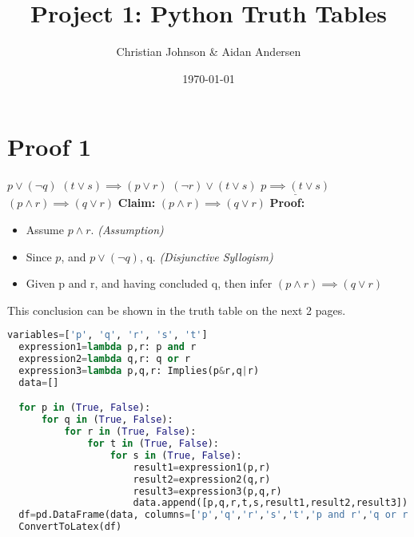 \documentclass[11pt]{article}
\author{Christian Johnson \& Aidan Andersen}
\date{\today}
\title{Project 1: Python Truth Tables}
\begin{document}
\maketitle
\newpage
\section*{Proof 1}
\label{sec:org636193d}
$p\lor(\lnot q)$\newline
$(t\lor s)\implies(p\lor r)$\newline
$(\lnot r)\lor(t\lor s)$\newline
$\underline{p\implies(t\lor s)}$\newline
$(p\land r)\implies(q\lor r)$\newline\newline
\textbf{Claim:} $(p \land r) \implies (q\lor r)$\newline
\newline
\textbf{Proof:}
\begin{itemize}
\item Assume $p \land r$. \textit{(Assumption)}
\item Since $p$, and $p\lor(\lnot q)$, q. \textit{(Disjunctive Syllogism)}
\item Given p and r, and having concluded q, then infer $(p\land r) \implies (q\lor r)$


\end{itemize}
\newline\newline
This conclusion can be shown in the truth table on the next 2 pages.
\newpage
\begin{lstlisting}[language=Python]
  variables=['p', 'q', 'r', 's', 't']
  expression1=lambda p,r: p and r
  expression2=lambda q,r: q or r
  expression3=lambda p,q,r: Implies(p&r,q|r)
  data=[]

  for p in (True, False):
      for q in (True, False):
          for r in (True, False):
              for t in (True, False):
                  for s in (True, False):
                      result1=expression1(p,r)
                      result2=expression2(q,r)
                      result3=expression3(p,q,r)
                      data.append([p,q,r,t,s,result1,result2,result3])
  df=pd.DataFrame(data, columns=['p','q','r','s','t','p and r','q or r','(p and r) implies (q or r)'])
  ConvertToLatex(df)
\end{lstlisting}


\newpage
\hspace{-2cm}
\newpage
\end{document}
